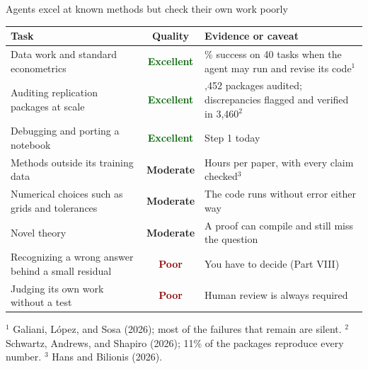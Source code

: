 \documentclass[aspectratio=169,10pt]{beamer}
\newcommand{\emphc}[1]{\textcolor{harvardcrimson}{#1}}
\begin{document}
\begin{frame}{Agents excel at known methods but check their own work poorly}
\begin{center}
\small
\renewcommand{\arraystretch}{1.22}
\begin{tabular}{@{}>{\raggedright\arraybackslash}p{5.2cm} c >{\raggedright\arraybackslash}p{6.2cm}@{}}
\toprule
\textbf{Task} & \textbf{Quality} & \textbf{Evidence or caveat} \\
\midrule
Data work and standard econometrics & \textcolor{darkgreen}{\textbf{Excellent}} & 97\% success on 40 tasks when the agent may run and revise its code$^{1}$ \\
Auditing replication packages at scale & \textcolor{darkgreen}{\textbf{Excellent}} & 4,452 packages audited; discrepancies flagged and verified in 3,460$^{2}$ \\
Debugging and porting a notebook & \textcolor{darkgreen}{\textbf{Excellent}} & Step 1 today \\
\midrule
Methods outside its training data & \textcolor{softorange}{\textbf{Moderate}} & Hours per paper, with every claim checked$^{3}$ \\
Numerical choices such as grids and tolerances & \textcolor{softorange}{\textbf{Moderate}} & The code runs without error either way \\
Novel theory & \textcolor{softorange}{\textbf{Moderate}} & A proof can compile and still miss the question \\
\midrule
Recognizing a wrong answer behind a small residual & \textcolor{darkred}{\textbf{Poor}} & You have to decide (Part VIII) \\
Judging its own work without a test & \textcolor{darkred}{\textbf{Poor}} & \emphc{Human review is always required} \\
\bottomrule
\end{tabular}
\end{center}
\vspace{-0.3em}
{\scriptsize\textcolor{uzhgreydark}{$^{1}$ Galiani, L\'opez, and Sosa (2026); most of the failures that remain are silent. $^{2}$ Schwartz, Andrews, and Shapiro (2026); 11\% of the packages reproduce every number. $^{3}$ Hans and Bilionis (2026).}}
\end{frame}
\end{document}

